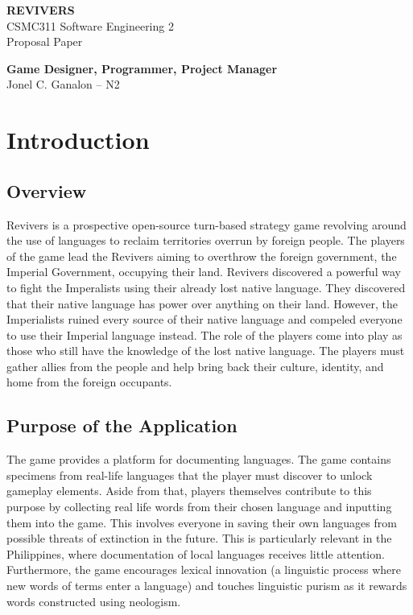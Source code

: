 \documentclass[11pt]{article}
\begin{document}
\begin{titlepage}
  \thispagestyle{fancy}
  
  \vspace*{4cm}
  \centering
  \vfill
  {\LARGE \textbf{REVIVERS}} \\
  \vspace{0.5cm}
  CSMC311 Software Engineering 2 \\
  Proposal Paper
  
  \vfill
  
  \textbf{Game Designer, Programmer, Project Manager} \\
  Jonel C. Ganalon -- N2
  
  \vspace{1cm}
  
  \vfill 
\end{titlepage}

\tableofcontents
\newpage
\listoffigures
\newpage
\listoftables
\newpage

\section{Introduction}
\subsection{Overview}
Revivers is a prospective open-source turn-based strategy game revolving around the use of languages to reclaim territories overrun by foreign people. The players of the game lead the Revivers aiming to overthrow the foreign government, the Imperial Government, occupying their land. Revivers discovered a powerful way to fight the Imperalists using their already lost native language. They discovered that their native language has power over anything on their land. However, the Imperialists ruined every source of their native language and compeled everyone to use their Imperial language instead. The role of the players come into play as those who still have the knowledge of the lost native language. The players must gather allies from the people and help bring back their culture, identity, and home from the foreign occupants.


\subsection{Purpose of the Application}
The game provides a platform for documenting languages. The game contains specimens from real-life languages that the player must discover to unlock gameplay elements. Aside from that, players themselves contribute to this purpose by collecting real life words from their chosen language and inputting them into the game. This involves everyone in saving their own languages from possible threats of extinction in the future. This is particularly relevant in the Philippines, where documentation of local languages receives little attention. Furthermore, the game encourages lexical innovation (a linguistic process where new words of terms enter a language) and touches linguistic purism as it rewards words constructed using neologism.
\end{document}
